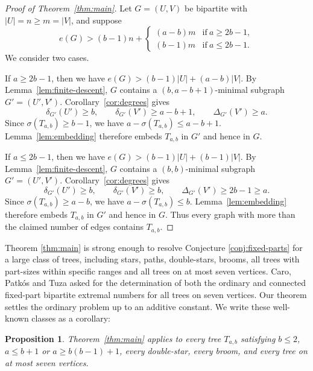\documentclass[10pt,a4paper]{amsart}
\newtheorem{proposition}[theorem]{Proposition}
\begin{document}
\begin{proof}[Proof of Theorem~\ref{thm:main}]
Let $G=(U,V)$ be bipartite with $|U|=n\ge m=|V|$, and suppose
\[
    e(G)>
    (b-1)n+\begin{cases}
    (a-b)m&\text{if}\ a\geq2b-1,\\
    (b-1)m&\text{if}\ a\leq2b-1.
    \end{cases}
\]
We consider two cases.

If $a\geq2b-1$, then we have $ e(G)>(b-1)|U|+(a-b)|V|.$ By Lemma~\ref{lem:finite-descent}, $G$ contains a $(b,a-b+1)$-minimal subgraph $G'=(U',V')$. Corollary~\ref{cor:degrees} gives
\[
    \delta_{G'}(U')\ge b,
    \qquad
    \delta_{G'}(V')\ge a-b+1,
    \qquad
    \Delta_{G'}(V')\ge a.
\]
Since $\sigma(T_{a,b})\ge b-1$, we have $a-\sigma(T_{a,b})\le a-b+1$.
Lemma~\ref{lem:embedding} therefore embeds $T_{a,b}$ in $G'$ and hence in $G$.

If $a\leq2b-1$, then we have $ e(G)>(b-1)|U|+(b-1)|V|.$ By Lemma~\ref{lem:finite-descent}, $G$ contains a $(b,b)$-minimal subgraph $G'=(U',V')$. Corollary~\ref{cor:degrees} gives
\[
    \delta_{G'}(U')\ge b,
    \qquad
    \delta_{G'}(V')\ge b,
    \qquad
    \Delta_{G'}(V')\ge 2b-1\geq a.
\]
Since $\sigma(T_{a,b})\ge a-b$, we have $a-\sigma(T_{a,b})\le b$.
Lemma~\ref{lem:embedding} therefore embeds $T_{a,b}$ in $G'$ and hence in $G$. Thus every graph with more than the claimed number of edges contains $T_{a,b}$.
\end{proof}


Theorem \ref{thm:main} is strong enough to resolve Conjecture \ref{conj:fixed-parts} for a large class of trees, including stars, paths, double-stars, brooms, all trees with part-sizes within specific ranges and all trees on at most seven vertices. Caro, Patk\'os and Tuza asked for the determination of both the ordinary and connected fixed-part bipartite extremal numbers for all trees on seven vertices. Our theorem settles the ordinary problem up to an additive constant. We write these well-known classes as a corollary:

\begin{proposition}
\label{prop:small-trees}
Theorem~\ref{thm:main} applies to every tree $T_{a,b}$ satisfying
$b\leq 2$, $a\leq b+1$ or $a\geq b(b-1)+1$, every double-star, every broom, and every tree on at most seven vertices.
\end{proposition}
\end{document}
